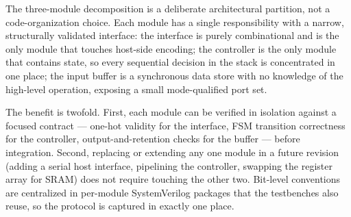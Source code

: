The three-module decomposition is a deliberate architectural partition,
not a code-organization choice. Each module has a single responsibility
with a narrow, structurally validated interface: the interface is
purely combinational and is the only module that touches host-side
encoding; the controller is the only module that contains state, so
every sequential decision in the stack is concentrated in one place;
the input buffer is a synchronous data store with no knowledge of the
high-level operation, exposing a small mode-qualified port set.

The benefit is twofold. First, each module can be verified in isolation
against a focused contract --- one-hot validity for the interface, FSM
transition correctness for the controller, output-and-retention checks
for the buffer --- before integration. Second, replacing or extending
any one module in a future revision (adding a serial host interface,
pipelining the controller, swapping the register array for SRAM) does
not require touching the other two. Bit-level conventions are
centralized in per-module SystemVerilog packages that the testbenches
also reuse, so the protocol is captured in exactly one place.

